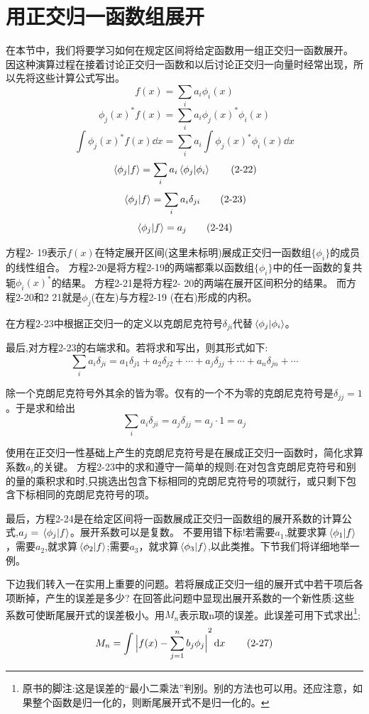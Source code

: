 \section{用正交归一函数组展开}
在本节中，我们将要学习如何在规定区间将给定函数用一组正交归一函数展开。
因这种演算过程在接着讨论正交归一函数和以后讨论正交归一向量时经常出现，所以先将这些计算公式写出。
\[f(x)=\sum_ia_i\phi_i(x) \tag{2-19}\]
\[\phi_j(x)^*f(x)=\sum_ia_i\phi_j(x)^*\phi_i(x) \tag{2-20}\]
\[\int\phi_j(x)^*f(x)\dd{x}=\sum_ia_i\int\phi_j(x)^*\phi_i(x)\dd{x} \tag{2-21}\]
\[\bra*{\phi_j}\ket*{f}=\sum_ia_i\bra*{\phi_j}\ket*{\phi_i} \tag{2-22}\]
\[\bra*{\phi_j}\ket*{f}=\sum_ia_i\delta_{ji} \tag{2-23}\]
\[\bra*{\phi_j}\ket*{f}=a_j \tag{2-24}\]

方程2- 19表示$f(x)$在特定展开区间(这里未标明)展成正交归一函数组$\{\phi_i\}$的成员的线性组合。
方程2-20是将方程2-19的两端都乘以函数组$\{\phi_i\}$中的任一函数的复共轭$\phi_i(x)^*$的结果。
方程2-21是将方程2- 20的两端在展开区间积分的结果。
而方程2-20和2 21就是$\phi_j$(在左)与方程2-19 (在右)形成的内积。

在方程2-23中根据正交归一的定义以克朗尼克符号$\delta_{ji}$代替$\bra*{\phi_j}\ket*{\phi_i}$。

最后,对方程2-23的右端求和。若将求和写出，则其形式如下:
\[\sum_ia_i\delta_{ji}=a_1\delta_{j1}+a_2\delta_{j2}+ \cdots +a_j\delta_{jj}+ \cdots +a_n\delta_{jn}+ \cdots \tag{2-25}\]

除一个克朗尼克符号外其余的皆为零。仅有的一个不为零的克朗尼克符号是$\delta_{jj}=1$。于是求和给出
\[\sum_ia_i\delta_{ji}=a_j\delta_{jj}=a_j \cdot 1=a_j \tag{2-26}\]

使用在正交归一性基础上产生的克朗尼克符号是在展成正交归一函数时，简化求算系数$a_i$的关键。
方程2-23中的求和遵守一简单的规则:在对包含克朗尼克符号和别的量的乘积求和时,只挑选出包含下标相同的克朗尼克符号的项就行，或只剩下包含下标相同的克朗尼克符号的项。

最后，方程2-24是在给定区间将一函数展成正交归一函数组的展开系数的计算公式,$a_j=\bra*{\phi_j}\ket*{f}$。展开系数可以是复数。
不要用错下标!若需要$a_1$,就要求算$\bra*{\phi_1}\ket*{f}$，需要$a_2$,就求算$\bra*{\phi_2}\ket*{f}$;需要$a_3$，就求算$\bra*{\phi_3}\ket*{f}$,以此类推。下节我们将详细地举一例。

下边我们转入一在实用上重要的问题。若将展成正交归一组的展开式中若干项后各项断掉，产生的误差是多少?
在回答此问题中显现出展开系数的一个新性质:这些系数可使断尾展开式的误差极小。用$M_n$表示取n项的误差。此误差可用下式求出\footnote{原书的脚注:这是误差的“最小二乘法”判别。别的方法也可以用。还应注意，如果整个函数是归一化的，则断尾展开式不是归一化的。};
\[M_n=\int\abs\Big{f(x)-\sum_{j=1}^nb_j\phi_j}^2\dd{x} \tag{2-27}\]

